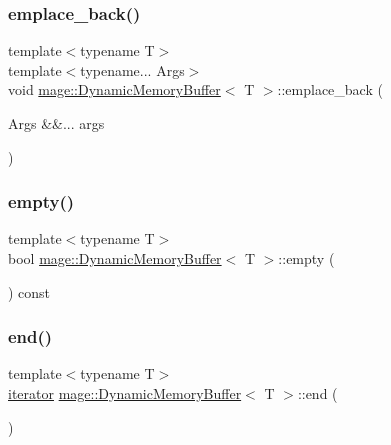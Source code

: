 \subsubsection{\texorpdfstring{emplace\+\_\+back()}{emplace\_back()}}
{\footnotesize\ttfamily template$<$typename T$>$ \\
template$<$typename... Args$>$ \\
void \mbox{\hyperlink{classmage_1_1_dynamic_memory_buffer}{mage\+::\+Dynamic\+Memory\+Buffer}}$<$ T $>$\+::emplace\+\_\+back (\begin{DoxyParamCaption}\item[{Args \&\&...}]{args }\end{DoxyParamCaption})}

\mbox{\label{classmage_1_1_dynamic_memory_buffer_aca99040ae14a82553dd9222a3ca71fc5}} 
\subsubsection{\texorpdfstring{empty()}{empty()}}
{\footnotesize\ttfamily template$<$typename T$>$ \\
bool \mbox{\hyperlink{classmage_1_1_dynamic_memory_buffer}{mage\+::\+Dynamic\+Memory\+Buffer}}$<$ T $>$\+::empty (\begin{DoxyParamCaption}{ }\end{DoxyParamCaption}) const\hspace{0.3cm}{\ttfamily [noexcept]}}

\mbox{\label{classmage_1_1_dynamic_memory_buffer_a0408a6e6e9eb2d6ca733ab38d31ecd48}} 
\subsubsection{\texorpdfstring{end()}{end()}\hspace{0.1cm}{\footnotesize\ttfamily [1/2]}}
{\footnotesize\ttfamily template$<$typename T$>$ \\
\mbox{\hyperlink{classmage_1_1_dynamic_memory_buffer_aa5dca8e81d0c2a9e63d3a9bc61cce904}{iterator}} \mbox{\hyperlink{classmage_1_1_dynamic_memory_buffer}{mage\+::\+Dynamic\+Memory\+Buffer}}$<$ T $>$\+::end (\begin{DoxyParamCaption}{ }\end{DoxyParamCaption})\hspace{0.3cm}{\ttfamily [noexcept]}}

